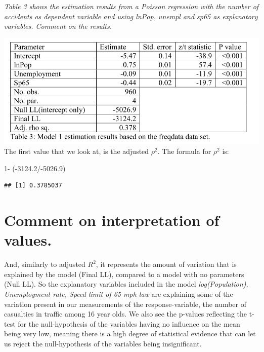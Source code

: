 \documentclass[
]{article}
\newenvironment{Shaded}{\begin{snugshade}}{\end{snugshade}}
\newcommand{\DecValTok}[1]{\textcolor[rgb]{0.00,0.00,0.81}{#1}}
\newcommand{\FloatTok}[1]{\textcolor[rgb]{0.00,0.00,0.81}{#1}}
\newcommand{\NormalTok}[1]{#1}
\newcommand{\SpecialCharTok}[1]{\textcolor[rgb]{0.00,0.00,0.00}{#1}}
\begin{document}
\emph{Table 3 shows the estimation results from a Poisson regression
with the number of accidents as dependent variable and using lnPop,
unempl and sp65 as explanatory variables. Comment on the results.}

\includegraphics{./images/model_1.png} The first value that we look at,
is the adjusted \(\rho^2\). The formula for \(\rho^2\) is:

\begin{Shaded}
\begin{Highlighting}[]
\DecValTok{1}\SpecialCharTok{{-}}\NormalTok{ (}\SpecialCharTok{{-}}\FloatTok{3124.2}\SpecialCharTok{/{-}}\FloatTok{5026.9}\NormalTok{)}
\end{Highlighting}
\end{Shaded}

\begin{verbatim}
## [1] 0.3785037
\end{verbatim}

\hypertarget{comment-on-interpretation-of-values.}{%
\section{Comment on interpretation of
values.}\label{comment-on-interpretation-of-values.}}

And, similarly to adjusted \(R^2\), it represents the amount of
variation that is explained by the model (Final LL), compared to a model
with no parameters (Null LL). So the explanatory variables included in
the model \emph{log(Population), Unemployment rate, Speed limit of 65
mph law} are explaining some of the variation present in our
measurements of the response-variable, the number of casualties in
traffic among 16 year olds. We also see the p-values reflecting the
t-test for the null-hypothesis of the variables having no influence on
the mean being very low, meaning there is a high degree of statistical
evidence that can let us reject the null-hypothesis of the variables
being insignificant.
\end{document}
